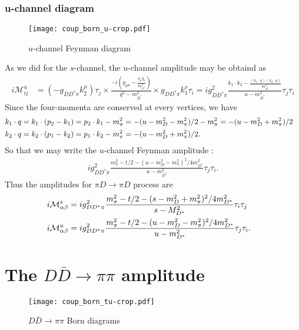 \documentclass[aps,prd,preprintnumbers,showpacs,showkeys,nofootinbib,
superscriptaddress,fleqn,floatfix,tightenlines, 10pt]{revtex4-1}
\begin{document}
\subsubsection{u-channel diagram}
\begin{figure}[H]
	\centering
	\texttt{[image: coup\_born\_u-crop.pdf]}
	\caption{$u$-channel Feynman diagram}
	\label{fig2}
\end{figure}
As we did for the $s$-channel, the $u$-channel amplitude may be obtaind as
\begin{align}
	i\mathcal{M}_{ij}^u &= (-g_{DD^* \pi} k_2^\mu) \tau_j \times
	\frac{-i\left(g_{\mu\nu} - \frac{q_\mu q_\nu}{m_{D^*}^2}\right)}{q^2-m_{D^*}^2} \times
	g_{DD^* \pi} k_1^\nu \tau_i = i g_{DD^* \pi}^2 \frac{k_1 \cdot k_2 -
	\frac{(k_1 \cdot q)(k_2 \cdot q)}{m_{D^*}^2}}{u-m_{D^*}^2} \tau_j \tau_i
\end{align}
Since the four-momenta are conserved at every vertices, we have
\begin{align}
	k_1 \cdot q &= k_1 \cdot (p_2 - k_1) = p_2 \cdot k_1 - m_\pi^2 = - (u - m_D^2 - m_\pi^2)/2 - m_\pi^2 = - (u - m_D^2 + m_\pi^2)/2 \cr
	k_2 \cdot q &= k_2 \cdot (p_1 - k_2) = p_1 \cdot k_2 - m_\pi^2 = - (u - m_D^2 + m_\pi^2)/2.
\end{align}
So that we may write the $u$-channel Feynman amplitude :
\begin{align}\label{dpidpi_u}
	i g_{DD^* \pi}^2 \frac{m_\pi^2 - t/2 - (u - m_D^2 - m_\pi^2)^2/4m_{D^*}^2}{u-m_{D^*}^2} \tau_j \tau_i.
\end{align}
Thus the amplitudes for $\pi D \rightarrow \pi D$ process are
\begin{align}
	i \mathcal{M}_{\alpha\beta}^s &= i g_{DD^* \pi}^2
	\frac{m_\pi^2 - t/2 - (s - m_D^2 + m_\pi^2)^2/4 m_{D^*}^2}{s - M_{D^*}^2} \tau_i \tau_j \cr
	i\mathcal{M}^u_{\alpha\beta} &= i g_{DD^* \pi}^2
	\frac{m_\pi^2 - t/2 - (u - m_D^2 - m_\pi^2)^2/4m_{D^*}^2}{u-m_{D^*}^2} \tau_j \tau_i.
\end{align}

\section{The $D \bar{D} \rightarrow \pi\pi$ amplitude}

\begin{figure}[H]
	\centering
	\texttt{[image: coup\_born\_tu-crop.pdf]}
	\caption{$D \bar{D} \rightarrow \pi\pi$ Born diagrams}
	\label{fig3}
\end{figure}
\end{document}
